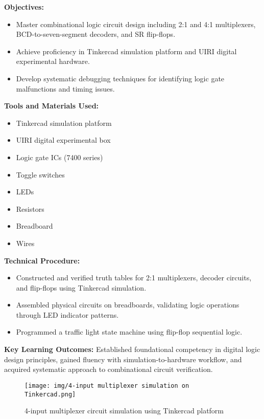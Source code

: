 \documentclass[12pt,a4paper]{report}
\begin{document}
\noindent\textbf{Objectives:}
\begin{itemize}
    \item Master combinational logic circuit design including 2:1 and 4:1 multiplexers, BCD-to-seven-segment decoders, and SR flip-flops.
    \item Achieve proficiency in Tinkercad simulation platform and UIRI digital experimental hardware.
    \item Develop systematic debugging techniques for identifying logic gate malfunctions and timing issues.
\end{itemize}

\noindent\textbf{Tools and Materials Used:}
\begin{multicols}{2}
\begin{itemize}
    \item Tinkercad simulation platform
    \item UIRI digital experimental box
    \item Logic gate ICs (7400 series)
    \item Toggle switches
    \item LEDs
    \item Resistors
    \item Breadboard
    \item Wires
\end{itemize}
\end{multicols}

\noindent\textbf{Technical Procedure:}
\begin{itemize}
    \item Constructed and verified truth tables for 2:1 multiplexers, decoder circuits, and flip-flops using Tinkercad simulation.
    \item Assembled physical circuits on breadboards, validating logic operations through LED indicator patterns.
    \item Programmed a traffic light state machine using flip-flop sequential logic.
\end{itemize}

\noindent\textbf{Key Learning Outcomes:} Established foundational competency in digital logic design principles, gained fluency with simulation-to-hardware workflow, and acquired systematic approach to combinational circuit verification.

\begin{figure}[H]
\centering
\texttt{[image: img/4-input multiplexer simulation on Tinkercad.png]}
\caption{4-input multiplexer circuit simulation using Tinkercad platform}
\label{fig:multiplexer-sim}
\end{figure}
\end{document}
